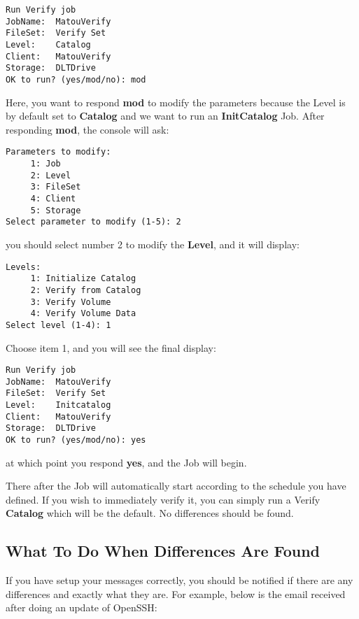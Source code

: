\footnotesize
\begin{verbatim}
Run Verify job
JobName:  MatouVerify
FileSet:  Verify Set
Level:    Catalog
Client:   MatouVerify
Storage:  DLTDrive
OK to run? (yes/mod/no): mod
\end{verbatim}
\normalsize

Here, you want to respond {\bf mod} to modify the parameters because the Level
is by default set to {\bf Catalog} and we want to run an {\bf InitCatalog}
Job. After responding {\bf mod}, the console will ask: 

\footnotesize
\begin{verbatim}
Parameters to modify:
     1: Job
     2: Level
     3: FileSet
     4: Client
     5: Storage
Select parameter to modify (1-5): 2
\end{verbatim}
\normalsize

you should select number 2 to modify the {\bf Level}, and it will display: 

\footnotesize
\begin{verbatim}
Levels:
     1: Initialize Catalog
     2: Verify from Catalog
     3: Verify Volume
     4: Verify Volume Data
Select level (1-4): 1
\end{verbatim}
\normalsize

Choose item 1, and you will see the final display: 

\footnotesize
\begin{verbatim}
Run Verify job
JobName:  MatouVerify
FileSet:  Verify Set
Level:    Initcatalog
Client:   MatouVerify
Storage:  DLTDrive
OK to run? (yes/mod/no): yes
\end{verbatim}
\normalsize

at which point you respond {\bf yes}, and the Job will begin. 

There after the Job will automatically start according to the schedule you
have defined. If you wish to immediately verify it, you can simply run a
Verify {\bf Catalog} which will be the default. No differences should be
found. 

\subsection*{What To Do When Differences Are Found}

If you have setup your messages correctly, you should be notified if there are
any differences and exactly what they are. For example, below is the email
received after doing an update of OpenSSH: 

